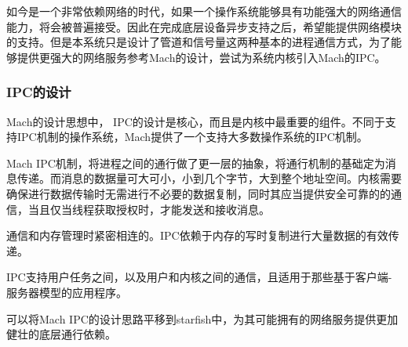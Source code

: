 如今是一个非常依赖网络的时代，如果一个操作系统能够具有功能强大的网络通信能力，将会被普遍接受。因此在完成底层设备异步支持之后，希望能提供网络模块的支持。但是本系统只是设计了管道和信号量这两种基本的进程通信方式，为了能够提供更强大的网络服务参考Mach的设计，尝试为系统内核引入Mach的IPC。

\subsubsection*{IPC的设计}


Mach的设计思想中， IPC的设计是核心，而且是内核中最重要的组件。不同于支持IPC机制的操作系统，Mach提供了一个支持大多数操作系统的IPC机制。

Mach IPC机制，将进程之间的通行做了更一层的抽象，将通行机制的基础定为消息传递。而消息的数据量可大可小，小到几个字节，大到整个地址空间。内核需要确保进行数据传输时无需进行不必要的数据复制，同时其应当提供安全可靠的的通信，当且仅当线程获取授权时，才能发送和接收消息。

通信和内存管理时紧密相连的。IPC依赖于内存的写时复制进行大量数据的有效传递。

IPC支持用户任务之间，以及用户和内核之间的通信，且适用于那些基于客户端-服务器模型的应用程序。

可以将Mach IPC的设计思路平移到starfish中，为其可能拥有的网络服务提供更加健壮的底层通行依赖。